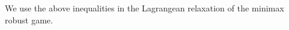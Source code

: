 \documentclass{article}
\begin{document}
We use the above inequalities in the Lagrangean relaxation of the minimax robust game.
\end{document}
